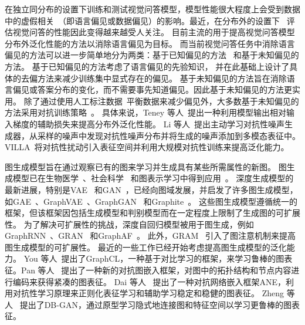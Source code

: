 
在独立同分布的设置下训练和测试视觉问答模型，模型性能很大程度上会受到数据中的虚假相关~\cite{zhang2016yin,agrawal2016analyzing,goyal2017making,agrawal2018don}（即语言偏见或数据偏见）的影响。最近，在分布外的设置下~\cite{guo2019quantifying,teney2020value,kervadec2021roses,gokhale2020mutant} 评估视觉问答的性能因此变得越来越受人关注。
目前主流的用于提高视觉问答模型分布外泛化性能的方法以消除语言偏见为目标。
而当前视觉问答任务中消除语言偏见的方法可以进一步简单地分为两类：基于已知偏见的方法~\cite{clark2019don,chen2020counterfactual,liang2020learning} 和基于未知偏见的方法\cite{teney2020unshuffling,gokhale2020mutant,clark2020learning}。
基于已知偏见的方法考虑了语言偏见的先验知识，
并在此基础上设计了具体的去偏方法来减少训练集中显式存在的偏见。
基于未知偏见的方法旨在消除语言偏见或答案分布的变化，而不需要事先知道偏见。因此基于未知偏见的方法更实用。
除了通过使用人工标注数据~\cite{selvaraju2019taking,wu2019self,gokhale2020mutant}平衡数据来减少偏见外，大多数基于未知偏见的方法采用对抗训练策略~\cite{grand2019adversarial,teney2020learning,teney2020value,gokhale2020mutant,li2020closer,gan2020large}。
具体来说，Teney 等人~\cite{teney2020learning}提出一种利用模型输出相对输入梯度的辅助损失来提高分布外泛化性能。
Li 等人~\cite{li2020closer}提出主动学习对抗性噪声生成器，从采样的噪声中发现对抗性噪声分布并将生成的噪声添加到多模态表征中。
VILLA~\cite{gan2020large}将对抗性扰动引入表征空间并利用大规模对抗性训练来提高泛化能力。


图生成模型旨在通过观察已有的图来学习并生成具有某些所需属性的新图。
图生成模型已在生物医学~\cite{de2018molgan}、社会科学~\cite{nauata2020house} 和图表示学习中得到应用~\cite{yu2018learning,pan2018adversarially,wang2018graphgan}。
深度生成模型的最新进展，特别是VAE~\cite{kingma2013auto} 和GAN~\cite{goodfellow2014generative}，已经向图域发展，并启发了许多图生成模型，如GAE~\cite{kipf2016variational}、GraphVAE~\cite{simonovsky2018graphvae}、GraphGAN~\cite{wang2018graphgan} 和Graphite~\cite{grover2019graphite}。
这些图生成模型遵循统一的框架，但该框架因包括生成模型和判别模型而在一定程度上限制了生成图的可扩展性。
为了解决可扩展性的挑战，深度自回归模型被用于图生成，例如GraphRNN~\cite{you2018graphrnn}、GRAN~\cite{liao2019efficient} 和GraphAF~\cite{shi2020graphaf}。
此外，GRAM~\cite{kawai2019scalable} 引入了图注意机制来提高图生成模型的可扩展性。
最近的一些工作已经开始考虑提高图生成模型的泛化能力。
You 等人~\cite{you2020graph}提出了GraphCL，一种基于对比学习的框架，来学习鲁棒的图表征。Pan 等人~\cite{pan2018adversarially} 提出了一种新的对抗图嵌入框架，对图中的拓扑结构和节点内容进行编码来获得紧凑的图表征。
Dai 等人~\cite{dai2018adversarial} 提出了一种对抗网络嵌入框架ANE，利用对抗性学习原理来正则化表征学习和辅助学习稳定和稳健的图表征。
Zheng 等人~\cite{zheng2020distribution} 提出了DB-GAN，通过原型学习隐式地连接图和特征空间以学习更鲁棒的图表征。


